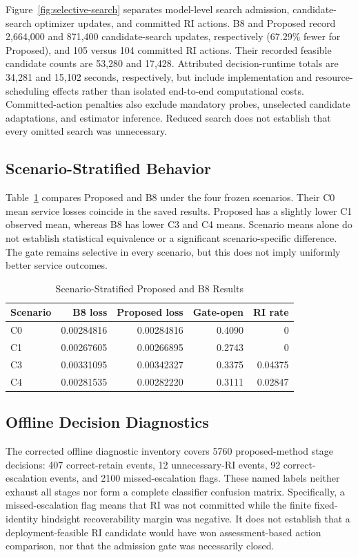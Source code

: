 \documentclass[journal]{IEEEtran}
\begin{document}
Figure~\ref{fig:selective-search} separates model-level search
admission, candidate-search optimizer updates, and committed RI
actions. B8 and Proposed record 2,664,000 and 871,400 candidate-search
updates, respectively (67.29\% fewer for Proposed), and 105 versus
104 committed RI actions. Their recorded feasible candidate counts
are 53,280 and 17,428. Attributed decision-runtime totals are
34,281 and 15,102 seconds, respectively, but include implementation
and resource-scheduling effects rather than isolated end-to-end
computational costs. Committed-action penalties also exclude
mandatory probes, unselected candidate adaptations, and estimator
inference. Reduced search does not establish that every omitted
search was unnecessary.

\subsection{Scenario-Stratified Behavior}
Table~\ref{tab:scenario} compares Proposed and B8 under the four
frozen scenarios. Their C0 mean service losses coincide in the saved
results. Proposed has a slightly lower C1 observed mean, whereas B8
has lower C3 and C4 means. Scenario means alone do not establish
statistical equivalence or a significant scenario-specific difference.
The gate remains selective in every scenario, but this does not
imply uniformly better service outcomes.

\begin{table}[t]
\caption{Scenario-Stratified Proposed and B8 Results}
\label{tab:scenario}
\centering
\footnotesize
\begin{tabular}{lrrrr}
\toprule
Scenario & B8 loss & Proposed loss & Gate-open & RI rate \\
\midrule
C0 & 0.00284816 & 0.00284816 & 0.4090 & 0 \\
C1 & 0.00267605 & 0.00266895 & 0.2743 & 0 \\
C3 & 0.00331095 & 0.00342327 & 0.3375 & 0.04375 \\
C4 & 0.00281535 & 0.00282220 & 0.3111 & 0.02847 \\
\bottomrule
\end{tabular}
\end{table}

\subsection{Offline Decision Diagnostics}
The corrected offline diagnostic inventory covers 5760 proposed-method
stage decisions: 407 correct-retain events, 12 unnecessary-RI events,
92 correct-escalation events, and 2100 missed-escalation flags.
These named labels neither exhaust all stages nor form a complete
classifier confusion matrix. Specifically, a missed-escalation flag
means that RI was not committed while the finite fixed-identity
hindsight recoverability margin was negative. It does not establish
that a deployment-feasible RI candidate would have won assessment-based
action comparison, nor that the admission gate was necessarily closed.
\end{document}
